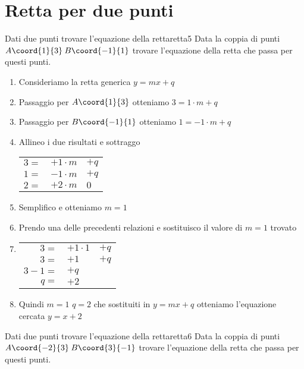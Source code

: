 \section{Retta per due punti}
\begin{esempiot}{Dati due punti trovare l'equazione della retta}{retta5}
Data la coppia di punti	$A\coord{1}{3}$\,$B\coord{-1}{1}$ trovare l'equazione della retta che passa per questi punti.
\end{esempiot}
\begin{enumerate}
	\item Consideriamo la retta generica $y=mx+q$
	\item Passaggio per $A\coord{1}{3}$ otteniamo $3=1\cdot m+q$
	\item Passaggio per $B\coord{-1}{1}$ otteniamo $1=-1\cdot m+q$
	\item Allineo i due risultati e sottraggo
	\begin{tabular}{rll}
	$3=$&$+1\cdot m$ &$+q$  \\ 
	$1=$&$-1\cdot m$ &$+q$  \\ 
	\hline  $2=$&$+2\cdot m$& $0$ \\ 
	\end{tabular} 
	\item Semplifico e otteniamo $m=1$
	\item Prendo una delle precedenti relazioni e sostituisco il valore di $m=1$ trovato
	\item \begin{tabular}{rll}
			$3=$&$+1\cdot 1$ &$+q$  \\ 
			$3=$&$+1$ &$+q$  \\ 
			$3-1=$& $+q$  \\ 
			$q=$&$+2$ 
		\end{tabular} 
	\item Quindi $m=1$ $q=2$ che sostituiti in $y=mx+q$ otteniamo l'equazione cercata $y=x+2$
\end{enumerate}
\begin{esempiot}{Dati due punti trovare l'equazione della retta}{retta6}
	Data la coppia di punti	$A\coord{-2}{3}$\,$B\coord{3}{-1}$ trovare l'equazione della retta che passa per questi punti.
\end{esempiot}
